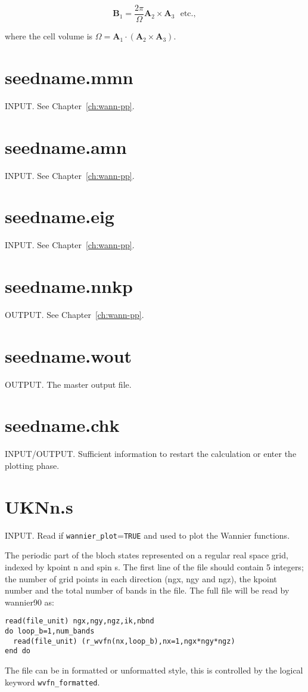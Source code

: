 \begin{equation}
\mathbf{B}_{1} = \frac{2\pi}{\Omega}\mathbf{A}_{2}\times\mathbf{A}_{3}
\ \ \ \mathrm{etc.},
\end{equation}

where the cell volume is
$\Omega=\mathbf{A}_{1}\cdot(\mathbf{A}_{2}\times\mathbf{A}_{3})$.

\section{seedname.mmn}
INPUT. See Chapter~\ref{ch:wann-pp}.

\section{seedname.amn}
INPUT. See Chapter~\ref{ch:wann-pp}.

\section{seedname.eig}
INPUT. See Chapter~\ref{ch:wann-pp}.

\section{seedname.nnkp} \label{sec:old-nnkp}
OUTPUT. See Chapter~\ref{ch:wann-pp}.

\section{seedname.wout}
OUTPUT. The master output file.


\section{seedname.chk}
INPUT/OUTPUT. Sufficient information to restart the calculation or enter the
plotting phase.

\section{UKNn.s}
INPUT. Read if \verb#wannier_plot#=\verb#TRUE# and used to plot the Wannier functions. 

The periodic part of the bloch states represented on a regular real space grid,
 indexed by kpoint n and spin s. 
The first line of the file should contain 5 integers; the number of grid points in each
direction (ngx, ngy and ngz), the kpoint number and the total number of bands in
the file. The full file will be read by wannier90 as:

\begin{verbatim}
read(file_unit) ngx,ngy,ngz,ik,nbnd
do loop_b=1,num_bands
  read(file_unit) (r_wvfn(nx,loop_b),nx=1,ngx*ngy*ngz)
end do
\end{verbatim}

The file can be in formatted or unformatted style, this is controlled by the logical keyword \verb#wvfn_formatted#.



